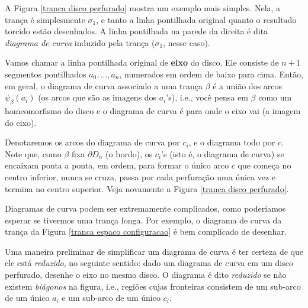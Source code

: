 	\par\vspace{0.3cm} A Figura \ref{tranca disco perfurado} mostra um exemplo mais simples. 
	Nela, a trança é simplesmente $\sigma_1$, e tanto a linha pontilhada original quanto o 
	resultado torcido estão desenhados. A linha pontilhada na parede da direita é dita 
	\textit{diagrama de curva} induzido pela trança ($\sigma_1$, nesse caso).
	
	\par\vspace{0.3cm} Vamos chamar a linha pontilhada original de \textbf{eixo} do disco. 
	Ele consiste de $n+1$ segmentos pontilhados $a_0, \dots, a_n$, numerados em ordem de baixo 
	para cima. Então, em geral, o diagrama de curva associado a uma trança $\beta$ é a união 
	dos arcos $\psi_{\beta}(a_i)$ (os arcos que são as imagens dos $a_i$'s), i.e., você pensa 
	em $\beta$ como um homeomorfismo do disco e o diagrama de curva é para onde o eixo vai (a imagem do eixo).
	
	\par\vspace{0.3cm} Denotaremos os arcos do diagrama de curva por $c_i$, e o diagrama todo por $c$. 
	Note que, como $\beta$ fixa $\partial D_n$ (o bordo), os $c_i$'s (isto é, o diagrama de curva) 
	se encaixam ponta a ponta, em ordem, para formar o único arco $c$ que começa no centro inferior, 
	nunca se cruza, passa por cada perfuração uma única vez e termina no centro superior. 
	Veja novamente a Figura \ref{tranca disco perfurado}.
	
	\par\vspace{0.3cm} Diagramas de curva podem ser extremamente complicados, como poderíamos esperar 
	se tivermos uma trança longa. Por exemplo, o diagrama de curva da trança da 
	Figura \ref{tranca espaco configuracao} é bem complicado de desenhar.
	
	\par\vspace{0.3cm} Uma maneira preliminar de simplificar um diagrama de curva é ter certeza 
	de que ele está \textit{reduzido}, no seguinte sentido: dado um diagrama de curva em um disco 
	perfurado, desenhe o eixo no mesmo disco. O diagrama é dito \textit{reduzido} se não 
	existem \textit{biágonos} na figura, i.e., regiões cujas fronteiras consistem de um 
	sub-arco de um único $a_i$ e um sub-arco de um único $c_i$.
	
